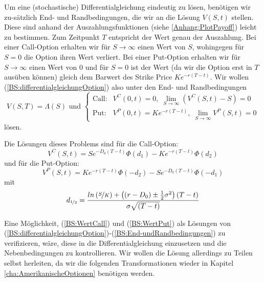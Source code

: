 Um eine (stochastische) Differentialgleichung eindeutig zu lösen, benötigen wir zu-sätzlich End- und Randbedingungen, die wir an die Lösung $V(S,t)$ stellen. Diese sind anhand der Auszahlungsfunktionen (siehe \ref{Anhang:PlotPayoff}) leicht zu bestimmen. Zum Zeitpunkt $T$ entspricht der Wert genau der Auszahlung. Bei einer Call-Option erhalten wir für $S \to \infty$ einen Wert von $S$, wohingegen für $S = 0$ die Option ihren Wert verliert. Bei einer Put-Option erhalten wir für $S \to \infty$ einen Wert von $0$ und für $S = 0$ ist der Wert (da wir die Option erst in $T$ ausüben können) gleich dem Barwert des Strike Price $Ke^{-r(T-t)}$. Wir wollen (\ref{BS:differentialgleichungOption}) also unter den End- und Randbedingungen 
\begin{equation} \label{BS:End-undRandbedingungen}
V(S,T) = \Lambda(S) \text{ und }
\begin{cases}
\text{Call:} & V^C(0,t) = 0,\; \lim\limits_{S \rightarrow \infty } {\left( V^C(S,t)-S\right)} = 0 \\
\text{Put:} & V^P(0,t) = Ke^{-r\left(T-t\right)},\; \lim\limits_{S \rightarrow \infty }{V^P(S,t)} = 0  
\end{cases}
\end{equation}
lösen.

Die Lösungen dieses Problems sind für die Call-Option:
\begin{equation}
V^C(S,t) = Se^{-D_0(T-t)}\Phi\left(d_1\right) - Ke^{-r(T-t)}\Phi\left(d_2\right) \label{BS:WertCall}
\end{equation}
und für die Put-Option:
\begin{equation}
V^P(S,t) = Ke^{-r(T-t)} \Phi\left(-d_2\right)  - Se^{-D_0(T-t)} \Phi\left(-d_1\right) \label{BS:WertPut}
\end{equation}
mit 
\begin{equation*}
d_{\nicefrac{1}{2}} = \frac{ln\left(\nicefrac{S}{K}\right) +\left(\left(r-D_0\right)\pm\frac{1}{2}\sigma^2\right)\left(T-t\right)}{\sigma\sqrt{(T-t)}}
\end{equation*}




Eine Möglichkeit, (\ref{BS:WertCall}) und (\ref{BS:WertPut}) als Lösungen von (\ref{BS:differentialgleichungOption})-(\ref{BS:End-undRandbedingungen}) zu verifizieren, wäre, diese in die Differentialgleichung einzusetzen und die Nebenbedingungen zu kontrollieren. Wir wollen die Lösung allerdings zu Teilen selbst herleiten, da wir die folgenden Transformationen wieder in Kapitel \ref{cha:AmerikanischeOptionen} benötigen werden.

